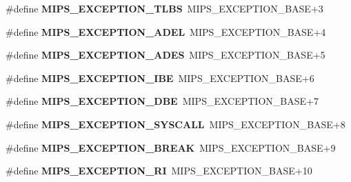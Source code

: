 \begin{DoxyCompactItemize}
\#define {\bfseries M\+I\+P\+S\+\_\+\+E\+X\+C\+E\+P\+T\+I\+O\+N\+\_\+\+T\+L\+BS}~M\+I\+P\+S\+\_\+\+E\+X\+C\+E\+P\+T\+I\+O\+N\+\_\+\+B\+A\+SE+3
\item 
\mbox{\label{group__RTEMSScoreCPUMIPSBuild_ga7e0e22eddcc1773c7acccfd409e0954f}} 
\#define {\bfseries M\+I\+P\+S\+\_\+\+E\+X\+C\+E\+P\+T\+I\+O\+N\+\_\+\+A\+D\+EL}~M\+I\+P\+S\+\_\+\+E\+X\+C\+E\+P\+T\+I\+O\+N\+\_\+\+B\+A\+SE+4
\item 
\mbox{\label{group__RTEMSScoreCPUMIPSBuild_ga43b8a0368101021b39952b31a61465c7}} 
\#define {\bfseries M\+I\+P\+S\+\_\+\+E\+X\+C\+E\+P\+T\+I\+O\+N\+\_\+\+A\+D\+ES}~M\+I\+P\+S\+\_\+\+E\+X\+C\+E\+P\+T\+I\+O\+N\+\_\+\+B\+A\+SE+5
\item 
\mbox{\label{group__RTEMSScoreCPUMIPSBuild_ga58506652329afab78c6ad9758f603e69}} 
\#define {\bfseries M\+I\+P\+S\+\_\+\+E\+X\+C\+E\+P\+T\+I\+O\+N\+\_\+\+I\+BE}~M\+I\+P\+S\+\_\+\+E\+X\+C\+E\+P\+T\+I\+O\+N\+\_\+\+B\+A\+SE+6
\item 
\mbox{\label{group__RTEMSScoreCPUMIPSBuild_ga852fbe9c2463de7bbce0952dd7fb503a}} 
\#define {\bfseries M\+I\+P\+S\+\_\+\+E\+X\+C\+E\+P\+T\+I\+O\+N\+\_\+\+D\+BE}~M\+I\+P\+S\+\_\+\+E\+X\+C\+E\+P\+T\+I\+O\+N\+\_\+\+B\+A\+SE+7
\item 
\mbox{\label{group__RTEMSScoreCPUMIPSBuild_ga587fac2a9dc7ccfa1367d02c9e84a686}} 
\#define {\bfseries M\+I\+P\+S\+\_\+\+E\+X\+C\+E\+P\+T\+I\+O\+N\+\_\+\+S\+Y\+S\+C\+A\+LL}~M\+I\+P\+S\+\_\+\+E\+X\+C\+E\+P\+T\+I\+O\+N\+\_\+\+B\+A\+SE+8
\item 
\mbox{\label{group__RTEMSScoreCPUMIPSBuild_ga63b83095f5417189475c85476b66c6b8}} 
\#define {\bfseries M\+I\+P\+S\+\_\+\+E\+X\+C\+E\+P\+T\+I\+O\+N\+\_\+\+B\+R\+E\+AK}~M\+I\+P\+S\+\_\+\+E\+X\+C\+E\+P\+T\+I\+O\+N\+\_\+\+B\+A\+SE+9
\item 
\mbox{\label{group__RTEMSScoreCPUMIPSBuild_ga42568959097f087ab07cfe07c084b08b}} 
\#define {\bfseries M\+I\+P\+S\+\_\+\+E\+X\+C\+E\+P\+T\+I\+O\+N\+\_\+\+RI}~M\+I\+P\+S\+\_\+\+E\+X\+C\+E\+P\+T\+I\+O\+N\+\_\+\+B\+A\+SE+10
\item 

\end{DoxyCompactItemize}
